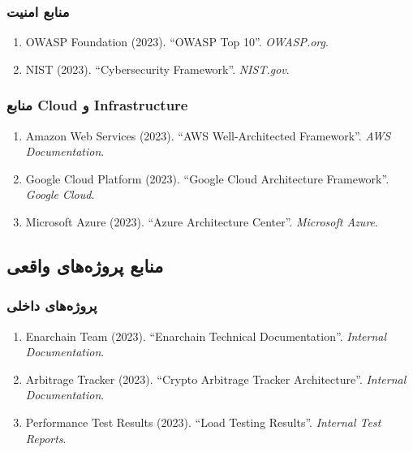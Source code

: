 \documentclass[
]{article}
\begin{document}
\subsubsection{منابع
امنیت}\label{ux645ux646ux627ux628ux639-ux627ux645ux646ux6ccux62a}

\begin{enumerate}
\def\labelenumi{\arabic{enumi}.}
\setcounter{enumi}{32}
\item
  OWASP Foundation (2023). ``OWASP Top 10''. \emph{OWASP.org}.
\item
  NIST (2023). ``Cybersecurity Framework''. \emph{NIST.gov}.
\end{enumerate}

\subsubsection{منابع Cloud و
Infrastructure}\label{ux645ux646ux627ux628ux639-cloud-ux648-infrastructure}

\begin{enumerate}
\def\labelenumi{\arabic{enumi}.}
\setcounter{enumi}{34}
\item
  Amazon Web Services (2023). ``AWS Well-Architected Framework''.
  \emph{AWS Documentation}.
\item
  Google Cloud Platform (2023). ``Google Cloud Architecture Framework''.
  \emph{Google Cloud}.
\item
  Microsoft Azure (2023). ``Azure Architecture Center''. \emph{Microsoft
  Azure}.
\end{enumerate}

\subsection{منابع پروژه‌های
واقعی}\label{ux645ux646ux627ux628ux639-ux67eux631ux648ux698ux647ux647ux627ux6cc-ux648ux627ux642ux639ux6cc}

\subsubsection{پروژه‌های
داخلی}\label{ux67eux631ux648ux698ux647ux647ux627ux6cc-ux62fux627ux62eux644ux6cc}

\begin{enumerate}
\def\labelenumi{\arabic{enumi}.}
\setcounter{enumi}{37}
\item
  Enarchain Team (2023). ``Enarchain Technical Documentation''.
  \emph{Internal Documentation}.
\item
  Arbitrage Tracker (2023). ``Crypto Arbitrage Tracker Architecture''.
  \emph{Internal Documentation}.
\item
  Performance Test Results (2023). ``Load Testing Results''.
  \emph{Internal Test Reports}.
\end{enumerate}
\end{document}
